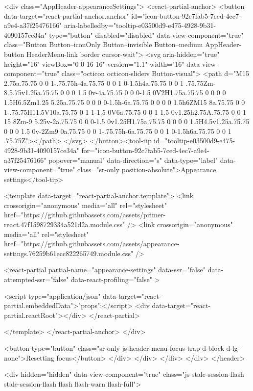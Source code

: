                 <div class="AppHeader-appearanceSettings">
    <react-partial-anchor>
      <button data-target="react-partial-anchor.anchor" id="icon-button-92c7fab5-7ced-4ec7-a9e4-a37f25476166" aria-labelledby="tooltip-e03500d9-e475-4928-9b31-4090157ce34a" type="button" disabled="disabled" data-view-component="true" class="Button Button--iconOnly Button--invisible Button--medium AppHeader-button HeaderMenu-link border cursor-wait">  <svg aria-hidden="true" height="16" viewBox="0 0 16 16" version="1.1" width="16" data-view-component="true" class="octicon octicon-sliders Button-visual">
    <path d="M15 2.75a.75.75 0 0 1-.75.75h-4a.75.75 0 0 1 0-1.5h4a.75.75 0 0 1 .75.75Zm-8.5.75v1.25a.75.75 0 0 0 1.5 0v-4a.75.75 0 0 0-1.5 0V2H1.75a.75.75 0 0 0 0 1.5H6.5Zm1.25 5.25a.75.75 0 0 0 0-1.5h-6a.75.75 0 0 0 0 1.5h6ZM15 8a.75.75 0 0 1-.75.75H11.5V10a.75.75 0 1 1-1.5 0V6a.75.75 0 0 1 1.5 0v1.25h2.75A.75.75 0 0 1 15 8Zm-9 5.25v-2a.75.75 0 0 0-1.5 0v1.25H1.75a.75.75 0 0 0 0 1.5H4.5v1.25a.75.75 0 0 0 1.5 0v-2Zm9 0a.75.75 0 0 1-.75.75h-6a.75.75 0 0 1 0-1.5h6a.75.75 0 0 1 .75.75Z"></path>
</svg>
</button><tool-tip id="tooltip-e03500d9-e475-4928-9b31-4090157ce34a" for="icon-button-92c7fab5-7ced-4ec7-a9e4-a37f25476166" popover="manual" data-direction="s" data-type="label" data-view-component="true" class="sr-only position-absolute">Appearance settings</tool-tip>

      <template data-target="react-partial-anchor.template">
        <link crossorigin="anonymous" media="all" rel="stylesheet" href="https://github.githubassets.com/assets/primer-react.47f1598729334a521d2a.module.css" />
<link crossorigin="anonymous" media="all" rel="stylesheet" href="https://github.githubassets.com/assets/appearance-settings.76259b61ecc822265749.module.css" />

<react-partial
  partial-name="appearance-settings"
  data-ssr="false"
  data-attempted-ssr="false"
  data-react-profiling="false"
>
  
  <script type="application/json" data-target="react-partial.embeddedData">{"props":{}}</script>
  <div data-target="react-partial.reactRoot"></div>
</react-partial>

      </template>
    </react-partial-anchor>
  </div>

          <button type="button" class="sr-only js-header-menu-focus-trap d-block d-lg-none">Resetting focus</button>
        </div>
      </div>
    </div>
  </div>
</header>

      <div hidden="hidden" data-view-component="true" class="js-stale-session-flash stale-session-flash flash flash-warn flash-full">
  

